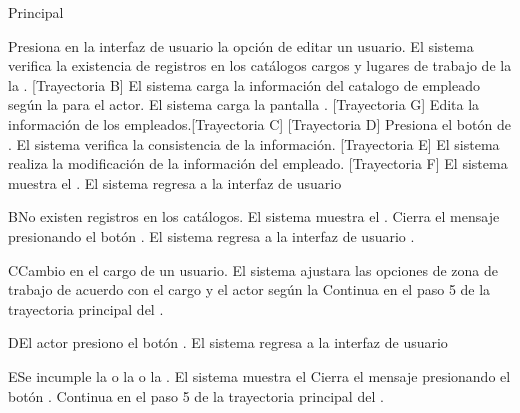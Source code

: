 \begin{UCtrayectoria}{Principal}
    
    \UCpaso[\UCactor] Presiona en la interfaz de usuario  la opción de editar un usuario. 
    \UCpaso  El sistema verifica la existencia de registros en los catálogos cargos  y  lugares de trabajo de la la  . [Trayectoria B] 
    \UCpaso El sistema carga la información del catalogo de empleado  según la  para el actor.
    \UCpaso El sistema carga la pantalla  . [Trayectoria G] 
    \UCpaso[\UCactor] Edita la información de los empleados.[Trayectoria C] [Trayectoria D]
    \UCpaso[\UCactor]  Presiona el botón de .
    \UCpaso El sistema verifica la consistencia de la información. [Trayectoria E] 
    \UCpaso El sistema realiza la modificación de la información del empleado. [Trayectoria F] 
    \UCpaso  El sistema muestra el .    
    \UCpaso El sistema regresa a la interfaz de usuario 
\end{UCtrayectoria}

\begin{UCtrayectoriaA}{B}{No existen registros en los catálogos.}
    \UCpaso     El sistema muestra el .
    \UCpaso[\UCactor] Cierra el mensaje presionando el botón .
    \UCpaso El sistema regresa a la interfaz de usuario .
\end{UCtrayectoriaA}

\begin{UCtrayectoriaA}{C}{Cambio en el cargo de un usuario.}
    \UCpaso     El sistema ajustara las opciones de zona de trabajo de acuerdo con el cargo y el actor según la 
    \UCpaso     Continua en el paso 5 de la trayectoria principal del .
\end{UCtrayectoriaA}

\begin{UCtrayectoriaA}{D}{El actor presiono el botón .}
 \UCpaso El sistema regresa a la interfaz de usuario 
\end{UCtrayectoriaA}

\begin{UCtrayectoriaA}{E}{Se incumple la  o la   o la   .}
	\UCpaso El sistema muestra el 
	\UCpaso[\UCactor] Cierra el mensaje presionando el botón .
	\UCpaso Continua en el paso 5 de la trayectoria principal del .
\end{UCtrayectoriaA}



